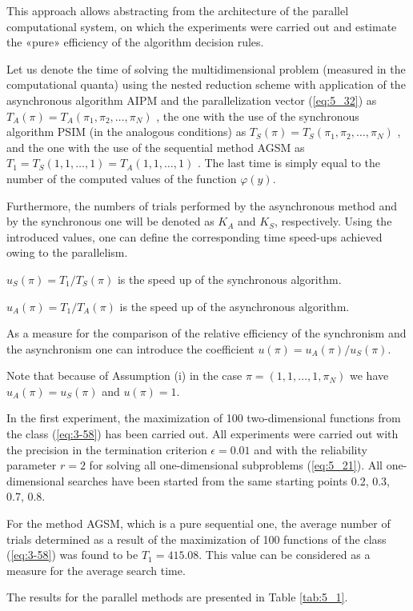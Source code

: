 This approach allows abstracting from the architecture of the parallel computational system, on which the experiments were carried out and estimate the «pure» efficiency of the algorithm decision rules. 

Let us denote the time of solving the multidimensional problem (measured in the computational quanta) using the nested reduction scheme with application of the asynchronous algorithm AIPM and the parallelization vector (\ref{eq:5_32}) as $T_A(\pi)=T_A(\pi_1,\pi_2,\ldots,\pi_N)$ , the one with the use of the synchronous algorithm PSIM  (in the analogous conditions) as $T_S(\pi)=T_S(\pi_1,\pi_2,\ldots,\pi_N)$ , and the one with the use of the sequential method AGSM as $T_1=T_S(1,1,\ldots,1)=T_A(1,1,\ldots,1)$ . The last time is simply equal to the number of the computed values of the function $\varphi(y)$.

Furthermore, the numbers of trials performed by the asynchronous method and by the synchronous one will be denoted as $K_A$  and $K_S$, respectively. Using the introduced values, one can define the corresponding time speed-ups achieved owing to the parallelism.

$u_S(\pi)=T_1/T_S(\pi)$ is the speed up of the synchronous algorithm.

$u_A(\pi)=T_1/T_A(\pi)$ is the speed up of the asynchronous algorithm.

As a measure for the comparison of the relative efficiency of the synchronism and the asynchronism one can introduce the coefficient $u(\pi)=u_A(\pi)/u_S(\pi)$.

Note that because of Assumption (i) in the case $\pi=(1,1,\ldots,1,\pi_N)$  we have $u_A(\pi)=u_S(\pi)$ and $u(\pi)=1$.

In the first experiment, the maximization of 100 two-dimensional functions from the class (\ref{eq:3-58}) has been carried out. All experiments were carried out with the precision in the termination criterion $\epsilon=0.01$  and with the reliability parameter $r=2$  for solving all one-dimensional subproblems (\ref{eq:5_21}). All one-dimensional searches have been started from the same starting points {0.2, 0.3, 0.7, 0.8}.

For the method AGSM, which is a pure sequential one, the average number of trials determined as a result of the maximization of 100 functions of the class (\ref{eq:3-58}) was found to be  $T_1= 415.08$. This value can be considered as a measure for the average search time. 

The results for the parallel methods are presented in Table \ref{tab:5_1}.

